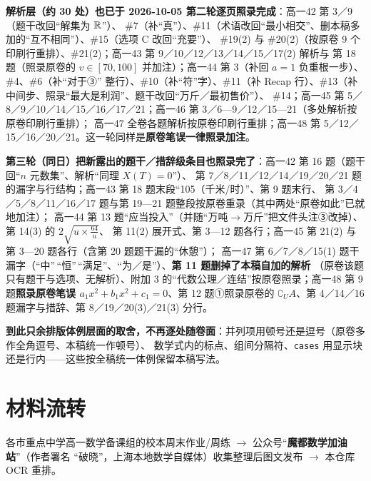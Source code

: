 \documentclass[a4paper,11pt]{article}
\begin{document}
\textbf{解析层（约 30 处）也已于 2026-10-05 第二轮逐页照录完成}：高一42 第 3／9（题干改回``解集为 \(\mathbb{R}\)''）、
\#7（补``真''）、\#11（术语改回``最小相交''、删本稿多加的``互不相同''）、\#15（选项 C 改回``充要''）、
\#19(2) 与 \#20(2)（按原卷 9 个印刷行重排）、\#21(2)；高一43 第 9／10／12／13／14／15／17(2) 解析与
第 18 题（照录原卷的 \(v\in[70,100]\) 并加注）；高一44 第 3（补回 \(a=1\) 负重根一步）、\#4、\#6（补``对于③''
整行）、\#10（补``符''字）、\#11（补 Recap 行）、\#13（补中间步、照录``最大是利润''、题干改回``万斤／最初售价''）、
\#14；高一45 第 5／8／9／10／14／15／16／17／21；高一46 第 3／6---9／12／15---21（多处解析按原卷印刷行重排）；
高一47 全卷各题解析按原卷印刷行重排；高一48 第 5／12／15／16／20／21。这一轮同样是\textbf{原卷笔误一律照录加注}。

\textbf{第三轮（同日）把新露出的题干／措辞级条目也照录完了}：高一42 第 16 题（题干回``\(n\) 元数集''、解析``同理 \(X(T)=0\)''）、
第 7／8／11／12／14／19／20／21 题的漏字与行结构；高一43 第 18 题末段``105（千米/时）''、第 9 题末行、
第 3／4／5／8／11／16／17 题与第 19---21 题整段按原卷重录（其中两处``原卷如此''已就地加注）；
高一44 第 13 题``应当投入''（并随``万吨$\to$万斤''把文件头注③改掉）、第 14(3) 的 \(2\sqrt{u\times\frac{64}u}\)、
第 11(2) 展开式、第 3---12 题各行；高一45 第 21(2) 与第 3---20 题各行（含第 20 题题干漏的``休憩''）；
高一47 第 6／7／8／15(1) 题干漏字（``中''\,``恒''\,``满足''、``为／是''）、\textbf{第 11 题删掉了本稿自加的解析}
（原卷该题只有题干与选项、无解析）、附加 3 的``代数公理／连结''按原卷照录；高一48 第 9 题\textbf{照录原卷笔误
\(a_1x^2+b_1x^2+c_1=0\)}、第 12 题①照录原卷的 \(\complement_U A\)、第 4／14／16 题漏字与措辞、第 8／19／20(3)／21(3) 分行。

\textbf{到此只余排版体例层面的取舍，不再逐处随卷面}：并列项用顿号还是逗号（原卷多作全角逗号、本稿统一作顿号）、
数学式内的标点、组间分隔符、\texttt{cases} 用显示块还是行内------这些按全稿统一体例保留本稿写法。

\clearpage
\section{材料流转}

各市重点中学高一数学备课组的校本周末作业/周练 $\to$ 公众号``\textbf{魔都数学加油站}''（作者署名
``破晓''，上海本地数学自媒体）收集整理后图文发布 $\to$ 本仓库 OCR 重排。
\end{document}
